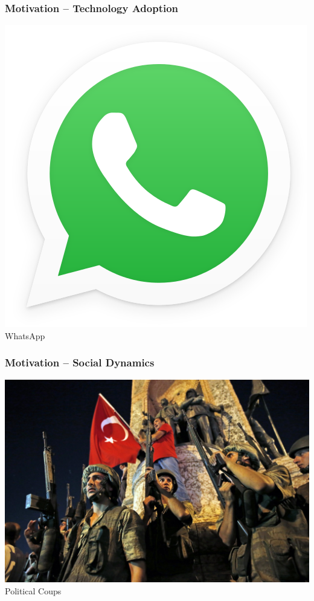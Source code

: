 \documentclass[slidestop,usenames,dvipsnames]{beamer}
\begin{document}
\begin{frame}
    \frametitle{Motivation -- Technology Adoption}
    \begin{center}
        \includegraphics[height=0.7\textheight]{img/whatsapp}
        \vfill\vspace{8pt}
        {\huge WhatsApp}
    \end{center}
    \vfill
\end{frame}

\begin{frame}
    \frametitle{Motivation -- Social Dynamics}
    \begin{center}
        \includegraphics[height=0.7\textheight]{img/coup}
        \vfill\vspace{8pt}
        {\huge Political Coups}
    \end{center}
    \vfill
\end{frame}
\end{document}
